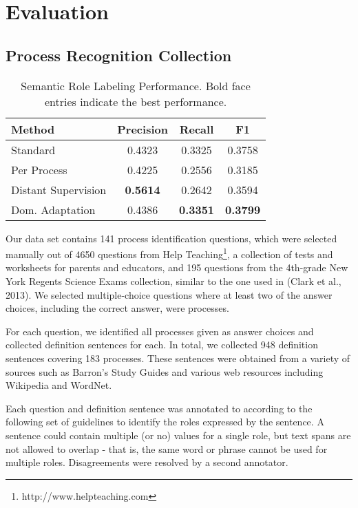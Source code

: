 \section{Evaluation}

\subsection{Process Recognition Collection}
\begin{table*}[htdp]
\begin{center}
\begin{tabular}{|l|c|c|c|}
\hline
Method			& 	Precision	&	Recall	&	F1\\
\hline
Standard			& 	0.4323	& 	0.3325	&	0.3758\\
Per Process		&	0.4225	& 	0.2556	& 	0.3185\\
Distant Supervision 	& 	{\bf 0.5614}	& 	0.2642	& 	0.3594 \\
Dom. Adaptation	& 	0.4386	& 	{\bf 0.3351}	& 	{\bf 0.3799}\\
\hline
\end{tabular}
\end{center}
\caption{Semantic Role Labeling Performance. Bold face entries indicate the best performance.}
\label{tab:srl-results}
\end{table*}%

Our data set contains 141 process identification questions, which were selected manually out of 4650 questions from Help Teaching\footnote{http://www.helpteaching.com}, a collection of tests and worksheets for parents and educators, and 195 questions from the 4th-grade New York Regents Science Exams collection, similar to the one used in (Clark et al., 2013). We selected multiple-choice questions where at least two of the answer choices, including the correct answer, were processes.

For each question, we identified all processes given as answer choices and collected definition sentences for each. In total, we collected 948 definition sentences covering 183 processes. These sentences were obtained from a variety of sources such as Barron's Study Guides and various web resources including Wikipedia and WordNet.

Each question and definition sentence was annotated to according to the following set of guidelines to identify the roles expressed by the sentence. A sentence could contain multiple (or no) values for a single role, but text spans are not allowed to overlap - that is, the same word or phrase cannot be used for multiple roles. Disagreements were resolved by a second annotator.

